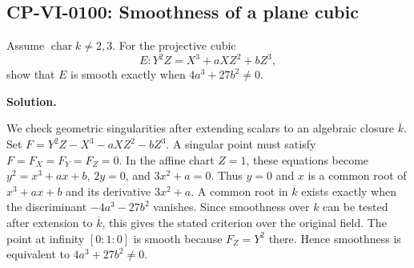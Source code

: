 
\subsection*{CP-VI-0100: Smoothness of a plane cubic}

Assume $\operatorname{char}k\ne2,3$. For the projective cubic
\[
E: Y^2Z=X^3+aXZ^2+bZ^3,
\]
show that $E$ is smooth exactly when $4a^3+27b^2\ne0$.

\medskip
\noindent\textbf{Solution.}

We check geometric singularities after extending scalars
to an algebraic closure $\overline{k}$. Set
$F=Y^2Z-X^3-aXZ^2-bZ^3$. A singular point must satisfy $F=F_X=F_Y=F_Z=0$. In the affine chart $Z=1$, these equations become $y^2=x^3+ax+b$, $2y=0$, and $3x^2+a=0$. Thus $y=0$ and $x$ is a common root of $x^3+ax+b$ and its derivative $3x^2+a$. A common root in $\overline{k}$ exists exactly when the
discriminant $-4a^3-27b^2$ vanishes. Since smoothness over $k$
can be tested after extension to $\overline{k}$, this gives the
stated criterion over the original field. The point at infinity $[0:1:0]$ is smooth because $F_Z=Y^2$ there. Hence smoothness is equivalent to $4a^3+27b^2\ne0$.
